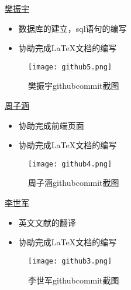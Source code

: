         
\underline{樊振宇}
\begin{itemize}
    \item 数据库的建立，sql语句的编写
    \item 协助完成LaTeX文档的编写
    \end{itemize}
    \begin{figure}[htbp]
        \centering
        \texttt{[image: github5.png]}
        \caption{樊振宇githubcommit截图}\label{fig:github}
        \vspace{\baselineskip}
        \end{figure}
    \underline{周子涵}
\begin{itemize}
    \item 协助完成前端页面
    \item 协助完成LaTeX文档的编写
    \end{itemize}
    \begin{figure}[htbp]
        \centering
        \texttt{[image: github4.png]}
        \caption{周子涵githubcommit截图}\label{fig:github4}
        \vspace{\baselineskip}
        \end{figure}
    \underline{李世军}
\begin{itemize}
    \item 英文文献的翻译
    \item 协助完成LaTeX文档的编写
    \end{itemize}
    \begin{figure}[htbp]
        \centering
        \texttt{[image: github3.png]}
        \caption{李世军githubcommit截图}\label{fig:github3}
        \vspace{\baselineskip}
        \end{figure}
    
      







